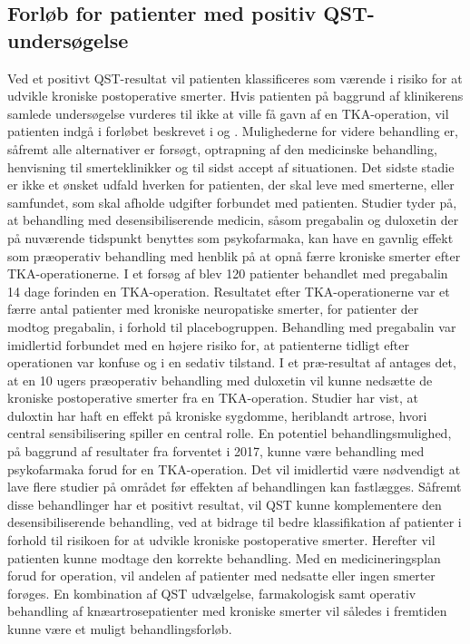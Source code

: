 \subsection{Forløb for patienter med positiv QST-undersøgelse}
Ved et positivt QST-resultat vil patienten klassificeres som værende i risiko for at udvikle kroniske postoperative smerter. Hvis patienten på baggrund af klinikerens samlede undersøgelse vurderes til ikke at ville få gavn af en TKA-operation, vil patienten indgå i forløbet beskrevet i  og . Mulighederne for videre behandling er, såfremt alle alternativer er forsøgt, optrapning af den medicinske behandling, henvisning til smerteklinikker og til sidst accept af situationen. Det sidste stadie er ikke et ønsket udfald hverken for patienten, der skal leve med smerterne, eller samfundet, som skal afholde udgifter forbundet med patienten.
Studier tyder på, at behandling med desensibiliserende medicin, såsom pregabalin og duloxetin der på nuværende tidspunkt benyttes som psykofarmaka, kan have en gavnlig effekt som præoperativ behandling med henblik på at opnå færre kroniske smerter efter TKA-operationerne. I et forsøg af  blev 120 patienter behandlet med pregabalin 14 dage forinden en TKA-operation. Resultatet efter TKA-operationerne var et færre antal patienter med kroniske neuropatiske smerter, for patienter der modtog pregabalin, i forhold til placebogruppen. Behandling med pregabalin var imidlertid forbundet med en højere risiko for, at patienterne tidligt efter operationen var konfuse og i en sedativ tilstand. \citep{Buvanendran2010} I et præ-resultat af  antages det, at en 10 ugers præoperativ behandling med duloxetin vil kunne nedsætte de kroniske postoperative smerter fra en TKA-operation. Studier har vist, at duloxtin har haft en effekt på kroniske sygdomme, heriblandt artrose, hvori central sensibilisering spiller en central rolle. \citep{Blikman2016} En potentiel behandlingsmulighed, på baggrund af resultater fra   forventet i 2017, kunne være behandling med psykofarmaka forud for en TKA-operation. Det vil imidlertid være nødvendigt at lave flere studier på området før effekten af behandlingen kan fastlægges. Såfremt disse behandlinger har et positivt resultat, vil QST kunne komplementere den desensibiliserende behandling, ved at bidrage til bedre klassifikation af patienter i forhold til risikoen for at udvikle kroniske postoperative smerter. Herefter vil patienten kunne modtage den korrekte behandling. Med en medicineringsplan forud for operation, vil andelen af patienter med nedsatte eller ingen smerter forøges. En kombination af QST udvælgelse, farmakologisk samt operativ behandling af knæartrosepatienter med kroniske smerter vil således i fremtiden kunne være et muligt behandlingsforløb.


